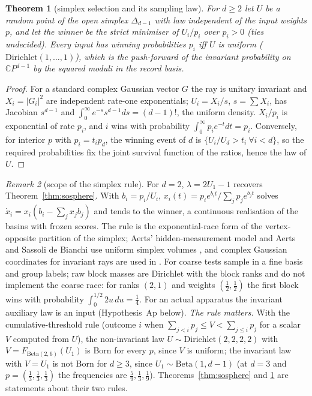 \documentclass[aps,pra,onecolumn,superscriptaddress,nofootinbib,10pt]{revtex4-2}
\newtheorem{theorem}{Theorem}
\theoremstyle{definition}
\theoremstyle{remark}
\newtheorem{remark}[theorem]{Remark}
\newcommand{\C}{\mathbb{C}}
\begin{document}
\begin{theorem}[simplex selection and its sampling law]\label{thm:sosimplex}
For $d\ge2$ let $U$ be a random point of the open simplex $\Delta_{d-1}$ with law independent of the input weights $p$, and let
the winner be the strict minimiser of $U_i/p_i$ over $p_i>0$ (ties undecided).  Every input has winning
probabilities $p_i$ iff $U$ is uniform ($\mathrm{Dirichlet}(1,\dots,1)$), which is the push-forward of the invariant probability on $\C P^{d-1}$
by the squared moduli in the record basis.
\end{theorem}
\begin{proof}
For a standard complex Gaussian vector $G$ the ray is unitary invariant and $X_i=\lvert G_i\rvert^2$ are independent rate-one
exponentials; $U_i=X_i/s$, $s=\sum X_i$, has Jacobian $s^{d-1}$ and $\int_0^\infty e^{-s}s^{d-1}ds=(d-1)!$, the uniform density.  $X_i/p_i$ is
exponential of rate $p_i$, and $i$ wins with probability $\int_0^\infty p_ie^{-t}dt=p_i$.  Conversely, for interior $p$ with $p_i=t_ip_d$,
the winning event of $d$ is $\{U_i/U_d>t_i\ \forall i<d\}$, so the required probabilities fix the joint survival function of
the ratios, hence the law of $U$.
\end{proof}

\begin{remark}[scope of the simplex rule]\label{rem:sobasinscope}
For $d=2$, $\lambda=2U_1-1$ recovers Theorem~\ref{thm:sosphere}.  With $b_i=p_i/U_i$, $x_i(t)=p_ie^{b_it}/\sum_jp_je^{b_jt}$ solves $\dot x_i=x_i(b_i-\sum_jx_jb_j)$
and tends to the winner, a continuous realisation of the basins with frozen scores.  The rule is the
exponential-race form of the vertex-opposite partition of the simplex; Aerts' hidden-measurement model \cite{rf:Aerts1986}
and Aerts and Sassoli de Bianchi use uniform simplex volumes \cite{n3:Aerts}, and complex Gaussian coordinates for invariant rays are used
in \cite{n3:Zyczkowski}.  For coarse tests sample in a fine basis and group labels; raw block masses are
$\mathrm{Dirichlet}$ with the block ranks and do not implement the coarse race: for ranks $(2,1)$ and weights $(\tfrac12,\tfrac12)$
the first block wins with probability $\int_0^{1/2}2u\,du=\tfrac14$.  For an actual apparatus the invariant auxiliary law is
an input (Hypothesis~Ap below).  \emph{The rule matters.}  With the cumulative-threshold rule (outcome $i$ when
$\sum_{j<i}p_j\le V<\sum_{j\le i}p_j$ for a scalar $V$ computed from $U$), the non-invariant law $U\sim\mathrm{Dirichlet}(2,2,2,2)$ with
$V=F_{\mathrm{Beta}(2,6)}(U_1)$ is Born for every $p$, since $V$ is uniform; the invariant law with $V=U_1$ is not Born for
$d\ge3$, since $U_1\sim\mathrm{Beta}(1,d-1)$ (at $d=3$ and $p=(\tfrac13,\tfrac13,\tfrac13)$ the frequencies are $\tfrac59,\tfrac13,\tfrac19$).  Theorems~\ref{thm:sosphere}
and \ref{thm:sosimplex} are statements about their two rules.
\end{remark}
\end{document}
